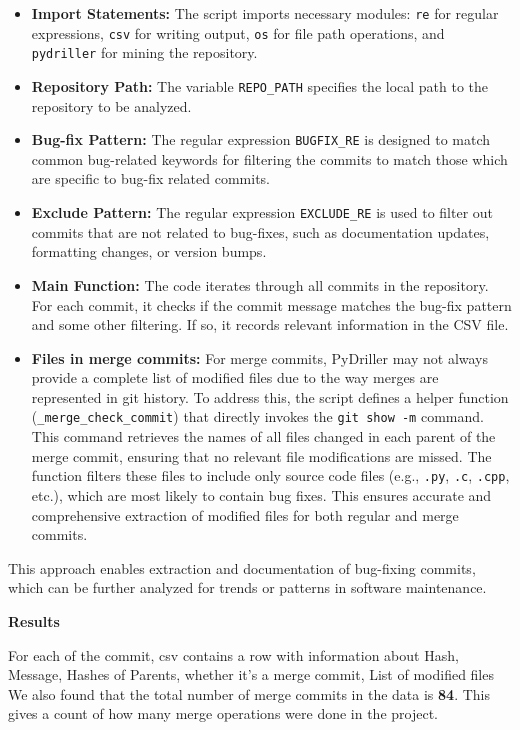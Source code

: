 \documentclass[12pt, a4paper]{report}
\newcommand{\sectionbar}[1]{%
  \vspace{0.6\baselineskip}%
  \noindent
  \colorbox{sectionbar}{%
    \parbox{\dimexpr\linewidth-2\fboxsep\relax}{%
      \textbf{\Large\textsf{#1}}%
    }%
  }%
  \vspace{0.6\baselineskip}
}
\begin{document}
\begin{itemize}
    \item \textbf{Import Statements:} The script imports necessary modules: \texttt{re} for regular expressions, \texttt{csv} for writing output, \texttt{os} for file path operations, and \texttt{pydriller} for mining the repository.
    \item \textbf{Repository Path:} The variable \texttt{REPO\_PATH} specifies the local path to the repository to be analyzed.
    \item \textbf{Bug-fix Pattern:} The regular expression \texttt{BUGFIX\_RE} is designed to match common bug-related keywords for filtering the commits to match those which are specific to bug-fix related commits.
    \item \textbf{Exclude Pattern:} The regular expression \texttt{EXCLUDE\_RE} is used to filter out commits that are not related to bug-fixes, such as documentation updates, formatting changes, or version bumps.
    \item \textbf{Main Function:} The code iterates through all commits in the repository. For each commit, it checks if the commit message matches the bug-fix pattern and some other filtering. If so, it records relevant information in the CSV file.
    \item \textbf{Files in merge commits:} For merge commits, PyDriller may not always provide a complete list of modified files due to the way merges are represented in git history. To address this, the script defines a helper function (\texttt{\_merge\_check\_commit}) that directly invokes the \texttt{git show -m} command. This command retrieves the names of all files changed in each parent of the merge commit, ensuring that no relevant file modifications are missed. The function filters these files to include only source code files (e.g., \texttt{.py}, \texttt{.c}, \texttt{.cpp}, etc.), which are most likely to contain bug fixes. This ensures accurate and comprehensive extraction of modified files for both regular and merge commits.
\end{itemize}

This approach enables extraction and documentation of bug-fixing commits, which can be further analyzed for trends or patterns in software maintenance.

\sectionbar{Results}

For each of the commit, csv contains a row with information about Hash, Message, Hashes of Parents, whether it's a merge commit, List of modified files
We also found that the total number of merge commits in the data is \textbf{84}.  
This gives a count of how many merge operations were done in the project.  
\end{document}
